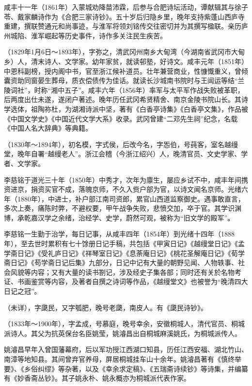 \begin{description}
        咸丰十一年（1861年）入蒙城劝降苗沛霖，后参与合肥诗坛活动，谭献辑其与徐子苓、戴家麟诗作为《合肥三家诗钞》。五十岁后归隐乡里，晚年支持紫蓬山西庐寺重建，撰联赞通元和尚事迹，与淮军将领刘铭传交往密切并为其撰写楹联。亲历庐州城陷、淮军崛起等历史事件，诗作多关注民生疾苦。
  \item[邓辅纶] （1829年1月6日～1893年），字弥之，清武冈州南乡大甸湾（今湖南省武冈市大甸乡）人，清末诗人、文学家。幼年家贫，就读邨塾，好诗文。咸丰元年（1851年）中恩科副榜，授内阁中书，官至浙江候补道员。壮年兼营商业，性慷慨重义，曾倾囊资助同窗晏生葬母，质衣偿债传为佳话。就读长沙城南书院时与王闿运等结“兰陵词社”，时称“湘中五子”。咸丰六年（1856年）率军与太平军作战失败被革职，后两度出仕未遂，遂闭户著述。晚年历任武冈希贤精舍、南京金陵书院山长。其诗学选体，祖陶祢杜，为湖湘诗派中坚，著有《白香亭诗集》《白香亭文集》，作品被《中国文学史》《中国近代文学大系》收录。武冈曾建“二邓先生祠”纪念，名载《中国人名大辞典》等典籍。
  \item[李慈铭] （1830年～1894年），初名模，字式侯，后改今名，字㤅伯，号莼客，室名越缦堂，晚年自署“越缦老人”。浙江会稽（今浙江绍兴）人，晚清官员、文史学家、学者、文学家。\par
        李慈铭于道光三十年（1850年）中秀才，次年为廪生，屡应乡试不中，咸丰年间携资进京，捐资买官不成，落魄京师，不久入赀户部为官，以诗文闻名京师。光绪六年（1880年），中进士，补户部江南司资郎，累官山西道监察御史。遇事敢直言，多次上奏，痛陈时弊，不避权要，甲午战争失败，悲愤交加，卒于官。其学识渊博，承乾嘉汉学之余绪，治经学、史学，蔚然可观，被称为“旧文学的殿军”。\par
        李慈铭一生勤于治学，每日记事，从咸丰四年（1854年）到光绪十四年（1888年），至去世时累积有七十馀册日记手稿，共包括《甲寅日记》《越缦堂日记》《孟学斋日记》《受礼庐日记》《祥琴室日记》《息荼庵日记》《桃花圣解庵日记》《荀学斋日记》《苟学斋日记后集》九部分，日记中记有大量的朝野见闻、人物轶事、社会风貌等内容；又有大量的读书劄记，涉及经史子集各部；同时还有关於名物考证、书画鉴赏等内容，及著者自撰之诗词等作品，《越缦堂文》也被誉为“晚清四大日记之冠”。
  \item[张祖继] （未详），字瓞民，又字瓠肥，晚号老瓞，南皮人。有《瓞民诗钞》。
  \item[姚濬昌] （1833年～1900年），字孟成，号慕庭，晚号幸余，安徽桐城人，清代官员、桐城派诗人。其父为抗英保台名臣姚莹，姚濬昌出自桐城麻溪姚氏，为桐城派传人。\par
        姚濬昌早年入曾国藩幕府，后以军功授江西湖口知县，历任江西安福、湖北竹山、南漳等地知县。其间曾弃官养母，屏居桐城挂车山十余年。姚濬昌著有《慎终举要》、《乡俗纠缪》等杂著，以及《幸余求定稿》、《五瑞斋诗续钞》等诗集，并编纂有《妙香斋丛钞》。其子姚永朴、姚永概亦为桐城派代表作家。

\end{description}
